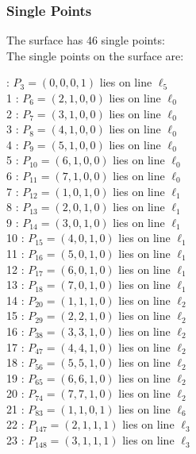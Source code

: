 \documentclass{article}
\begin{document}
{\subsubsection*{Single Points}
The surface has 46 single points:\\
The single points on the surface are:\\
\begin{multicols}{2}
 : $P_{3}=( 0, 0, 0, 1 )$ lies on line $\ell_{5}$\\
1 : $P_{6}=( 2, 1, 0, 0 )$ lies on line $\ell_{0}$\\
2 : $P_{7}=( 3, 1, 0, 0 )$ lies on line $\ell_{0}$\\
3 : $P_{8}=( 4, 1, 0, 0 )$ lies on line $\ell_{0}$\\
4 : $P_{9}=( 5, 1, 0, 0 )$ lies on line $\ell_{0}$\\
5 : $P_{10}=( 6, 1, 0, 0 )$ lies on line $\ell_{0}$\\
6 : $P_{11}=( 7, 1, 0, 0 )$ lies on line $\ell_{0}$\\
7 : $P_{12}=( 1, 0, 1, 0 )$ lies on line $\ell_{1}$\\
8 : $P_{13}=( 2, 0, 1, 0 )$ lies on line $\ell_{1}$\\
9 : $P_{14}=( 3, 0, 1, 0 )$ lies on line $\ell_{1}$\\
10 : $P_{15}=( 4, 0, 1, 0 )$ lies on line $\ell_{1}$\\
11 : $P_{16}=( 5, 0, 1, 0 )$ lies on line $\ell_{1}$\\
12 : $P_{17}=( 6, 0, 1, 0 )$ lies on line $\ell_{1}$\\
13 : $P_{18}=( 7, 0, 1, 0 )$ lies on line $\ell_{1}$\\
14 : $P_{20}=( 1, 1, 1, 0 )$ lies on line $\ell_{2}$\\
15 : $P_{29}=( 2, 2, 1, 0 )$ lies on line $\ell_{2}$\\
16 : $P_{38}=( 3, 3, 1, 0 )$ lies on line $\ell_{2}$\\
17 : $P_{47}=( 4, 4, 1, 0 )$ lies on line $\ell_{2}$\\
18 : $P_{56}=( 5, 5, 1, 0 )$ lies on line $\ell_{2}$\\
19 : $P_{65}=( 6, 6, 1, 0 )$ lies on line $\ell_{2}$\\
20 : $P_{74}=( 7, 7, 1, 0 )$ lies on line $\ell_{2}$\\
21 : $P_{83}=( 1, 1, 0, 1 )$ lies on line $\ell_{6}$\\
22 : $P_{147}=( 2, 1, 1, 1 )$ lies on line $\ell_{3}$\\
23 : $P_{148}=( 3, 1, 1, 1 )$ lies on line $\ell_{3}$\\

\end{multicols}}
\end{document}
